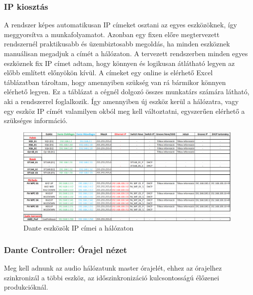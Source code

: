 \subsubsection{IP kiosztás}
A rendszer képes automatikusan IP címeket osztani az egyes eszközöknek,
így meggyorsítva a munkafolyamatot.
Azonban egy fixen előre megtervezett rendszernél praktikusabb és
üzembiztosabb megoldás, ha minden eszköznek manuálisan megadjuk a címét a
hálózaton. A tervezett rendszerben minden egyes eszköznek fix IP címet adtam,
hogy könnyen és logikusan átlátható legyen az előbb említett előnyökön kívül.
A címeket egy online is elérhető Excel táblázatban tároltam, hogy amennyiben szükség van rá
bármikor könnyen elérhető legyen. Ez a táblázat a cégnél dolgozó összes munkatárs számára látható,
aki a rendszerrel foglalkozik. Így amennyiben új eszköz kerül a hálózatra, vagy egy eszköz IP címét
valamilyen okból meg kell változtatni, egyszerűen elérhető a szükséges információ.
\begin{figure}[H]
	\centering
	\includegraphics[width=\textwidth, keepaspectratio]{figures/dante_ips.png}
	\caption{Dante eszközök IP címei a hálózaton}\label{fig:dante_ips}
\end{figure}





\subsubsection{Dante Controller: Órajel nézet}
Meg kell adnunk az audio hálózatunk master órajelét, ehhez az órajelhez
szinkronizál a többi eszköz, az időszinkronizáció kulcsontosságú élőzenei
produkcióknál.



